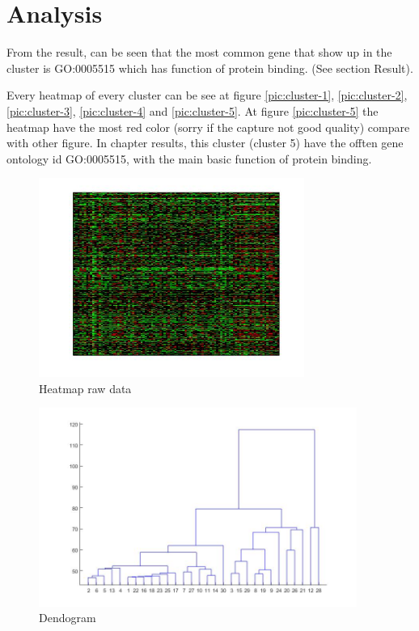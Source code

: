 \section{Analysis}
From the result, can be seen that the most common gene that show up in the cluster is GO:0005515 which has function of protein binding. (See section Result).

Every heatmap of every cluster can be see at figure \ref{pic:cluster-1}, \ref{pic:cluster-2}, \ref{pic:cluster-3}, \ref{pic:cluster-4} and \ref{pic:cluster-5}. At figure \ref{pic:cluster-5} the heatmap have the most red color (sorry if the capture not good quality) compare with other figure. In chapter results, this cluster (cluster 5) have the offten gene ontology id GO:0005515, with the main basic function of protein binding.

\begin{figure}[htbp]
	\centering
	\includegraphics[height=6.5cm]{analisis/raw.jpg}
	\caption{Heatmap raw data}
	\label{pic:raw}
\end{figure}

\begin{figure}[htbp]
	\centering
	\includegraphics[height=6.5cm]{analisis/dendogram.jpg}
	\caption{Dendogram}
	\label{pic:dendo}
\end{figure}

